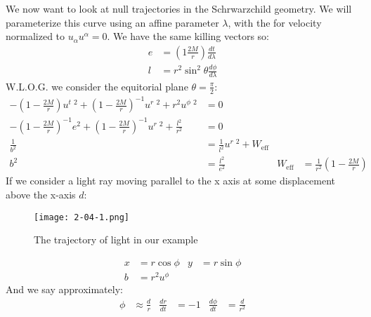 We now want to look at null trajectories in the Schrwarzchild geometry. We will parameterize this curve using an affine parameter $\lambda$, with the for velocity normalized to $u_\alpha u^\alpha = 0$.
We have the same killing vectors so:
\begin{align*}
	e &= \left( 1 \frac{2M}{r}\right) \frac{dt}{d\lambda} \\
	l &= r^2\sin^2\theta\frac{d\phi}{d\lambda}
\end{align*}
W.L.O.G. we consider the equitorial plane $\theta = \frac{\pi}{2}$:
\begin{align*}
	-\left(1 - \frac{2M}{r}\right)u^t\ ^2 + \left(1 -\frac{2M}{r}\right)^{-1} u^r\ ^2 + r^2u^\phi\ ^2 &=0 \\
	-\left(1 - \frac{2M}{r}\right)^{-1}e^2 + \left(1 -\frac{2M}{r}\right)^{-1} u^r\ ^2 + \frac{l^2}{r^2} &=0 \\
	\frac{1}{b^2} &= \frac{1}{l^2} u^r\ ^2 + W_\text{eff} \\
	b^2 &= \frac{l^2}{e^2} & W_\text{eff} &= \frac{1}{r^2} \left(1- \frac{2M}{r}\right)
\end{align*}
If we consider a light ray moving parallel to the x axis at some displacement above the x-axis $d$:
\begin{figure*}[h]
	\centering
	\texttt{[image: 2-04-1.png]}
	\caption*{The trajectory of light in our example}
\end{figure*}
\begin{align*}
	x &= r\cos\phi & y &= r\sin\phi \\
	b &= r^2 u^\phi
\end{align*}
And we say approximately:
\begin{align*}
	\phi &\approx \frac{d}{r} & \frac{dr}{dt} &= -1 & \frac{d\phi}{dt} &= \frac{d}{r^2}
\end{align*}
